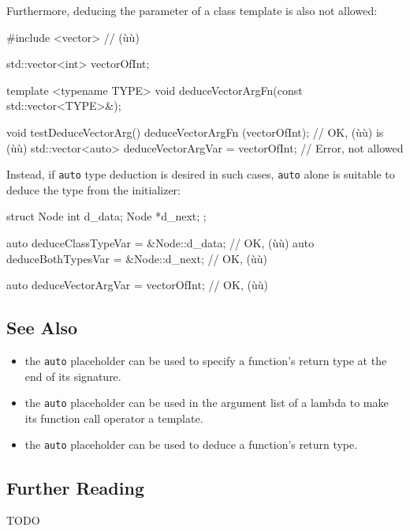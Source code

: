 \noindent Furthermore, deducing the parameter of a class template is also not
allowed:

\begin{emcppshiddenlisting}[emcppsbatch=e22]
#include <vector>     // (ù{}ù)
\end{emcppshiddenlisting}
\begin{emcppslisting}[emcppsbatch=e22]
std::vector<int> vectorOfInt;

template <typename TYPE>
void deduceVectorArgFn(const std::vector<TYPE>&);

void testDeduceVectorArg()
{
                      deduceVectorArgFn   (vectorOfInt); // OK, (ù{}ù) is (ù{}ù)
    std::vector<auto> deduceVectorArgVar = vectorOfInt;  // Error, not allowed
}
\end{emcppslisting}
    
\noindent Instead, if \lstinline!auto! type deduction is desired in such cases,
\lstinline!auto! alone is suitable to deduce the type from the initializer:

\begin{emcppshiddenlisting}[emcppsbatch=e22]
struct Node {
int d_data;
Node *d_next;
};
\end{emcppshiddenlisting}
\begin{emcppslisting}[emcppsbatch=e22]
auto deduceClassTypeVar = &Node::d_data;  // OK, (ù{}ù)
auto deduceBothTypesVar = &Node::d_next;  // OK, (ù{}ù)

auto deduceVectorArgVar = vectorOfInt;    // OK, (ù{}ù)
\end{emcppslisting}
    

\subsection[See Also]{See Also}\label{see-also}
\begin{itemize}
\item{the \lstinline!auto! placeholder can be used to specify a function’s return type at the end of its signature.}
\item{the \lstinline!auto! placeholder can be used in the argument list of a lambda to make its function call operator a template.}
\item{the \lstinline!auto! placeholder can be used to deduce a function’s return type.}

\end{itemize}

\subsection[Further Reading]{Further Reading}

TODO
 
 

